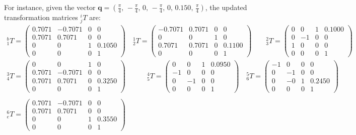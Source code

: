 For instance, given the vector $\mathbf{q} = (\frac{\pi}{4},\,-\frac{\pi}{4},\,0,\,-\frac{\pi}{4},\,0,\,0.150,\,\frac{\pi}{4})$, the updated transformation matrices $^i_j T$ are: 
\begin{gather*}
	^b_1 T = \begin{pmatrix}
		0.7071 & -0.7071 & 0 & 0 \\
		0.7071 & 0.7071 & 0 & 0 \\
		0 & 0 & 1 & 0.1050 \\
		0 & 0 & 0 & 1
	\end{pmatrix} \quad
	^1_2 T = \begin{pmatrix}
		-0.7071 & 0.7071 & 0 & 0 \\
		0 & 0 & 1 & 0 \\
		0.7071 & 0.7071 & 0 & 0.1100 \\
		0 & 0 & 0 & 1
	\end{pmatrix} \quad
	\quad ^2_3 T = \begin{pmatrix}
		0 & 0 & 1 & 0.1000 \\
		0 & -1 & 0 & 0 \\
		1 & 0 & 0 & 0 \\
		0 & 0 & 0 & 1
	\end{pmatrix} \\
	^3_4 T = \begin{pmatrix}
		0 & 0 & 1 & 0 \\
		0.7071 & -0.7071 & 0 & 0 \\
		0.7071 & 0.7071 & 0 & 0.3250 \\
		0 & 0 & 0 & 1
	\end{pmatrix} \quad
	\quad \quad ^4_5 T = \begin{pmatrix}
		0 & 0 & 1 & 0.0950 \\
		-1 & 0 & 0 & 0 \\
		0 & -1 & 0 & 0 \\
		0 & 0 & 0 & 1
	\end{pmatrix} \quad
	^5_6 T = \begin{pmatrix}
		-1 & 0 & 0 & 0 \\
		0 & -1 & 0 & 0 \\
		0 & -0 & 1 & 0.2450 \\
		0 & 0 & 0 & 1
	\end{pmatrix} \quad \\
	\\
	^6_e T = \begin{pmatrix}
		0.7071 & -0.7071 & 0 & 0 \\
		0.7071 & 0.7071 & 0 & 0 \\
		0 & 0 & 1 & 0.3550 \\
		0 & 0 & 0 & 1
	\end{pmatrix} \quad
	\nonumber
\end{gather*}
